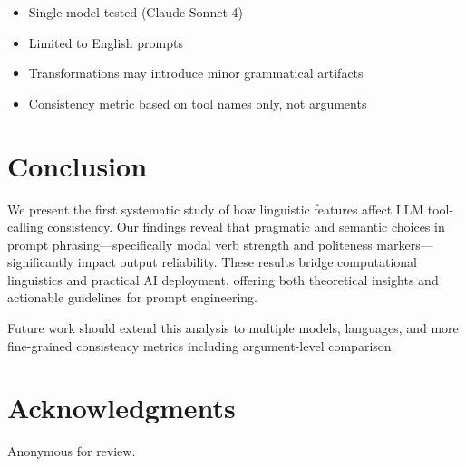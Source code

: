 \documentclass[11pt]{article}
\begin{document}
\begin{itemize}
    \item Single model tested (Claude Sonnet 4)
    \item Limited to English prompts
    \item Transformations may introduce minor grammatical artifacts
    \item Consistency metric based on tool names only, not arguments
\end{itemize}

\section{Conclusion}

We present the first systematic study of how linguistic features affect LLM tool-calling consistency. Our findings reveal that pragmatic and semantic choices in prompt phrasing---specifically modal verb strength and politeness markers---significantly impact output reliability. These results bridge computational linguistics and practical AI deployment, offering both theoretical insights and actionable guidelines for prompt engineering.

Future work should extend this analysis to multiple models, languages, and more fine-grained consistency metrics including argument-level comparison.

\section*{Acknowledgments}
Anonymous for review.


\end{document}
